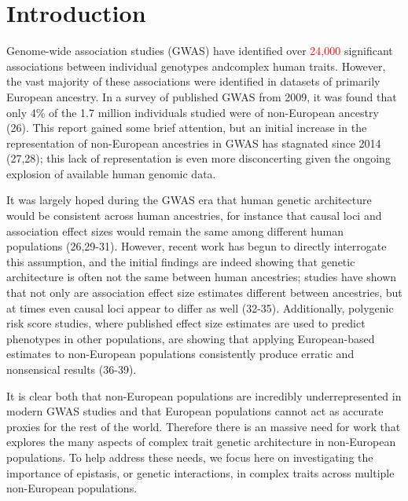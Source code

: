 \documentclass[12pt, a4paper]{article}
\begin{document}
\section{Introduction}\label{InterPath-Introduction}

Genome-wide association studies (GWAS) have identified over \textcolor{red}{24,000} significant associations between individual genotypes andcomplex human traits. However, the vast majority of these associations were identified in datasets of primarily European ancestry. In a survey of published GWAS from 2009, it was found that only 4\% of the 1.7 million individuals studied were of non-European ancestry (26). This report gained some brief attention, but an initial increase in the representation of non-European ancestries in GWAS has stagnated since 2014 (27,28); this lack of representation is even more disconcerting given the ongoing explosion of available human genomic data. 

It was largely hoped during the GWAS era that human genetic architecture would be consistent across human ancestries, for instance that causal loci and association effect sizes would remain the same among different human populations (26,29-31). However, recent work has begun to directly interrogate this assumption, and the initial findings are indeed showing that genetic architecture is often not the same between human ancestries; studies have shown that not only are association effect size estimates different between ancestries, but at times even causal loci appear to differ as well (32-35). Additionally, polygenic risk score studies, where published effect size estimates are used to predict phenotypes in other populations, are showing that applying European-based estimates to non-European populations consistently produce erratic and nonsensical results (36-39).

It is clear both that non-European populations are incredibly underrepresented in modern GWAS studies and that European populations cannot act as accurate proxies for the rest of the world. Therefore there is an massive need for work that explores the many aspects of complex trait genetic architecture in non-European populations. To help address these needs, we focus here on investigating the importance of epistasis, or genetic interactions, in complex traits across multiple non-European populations. 
\end{document}
